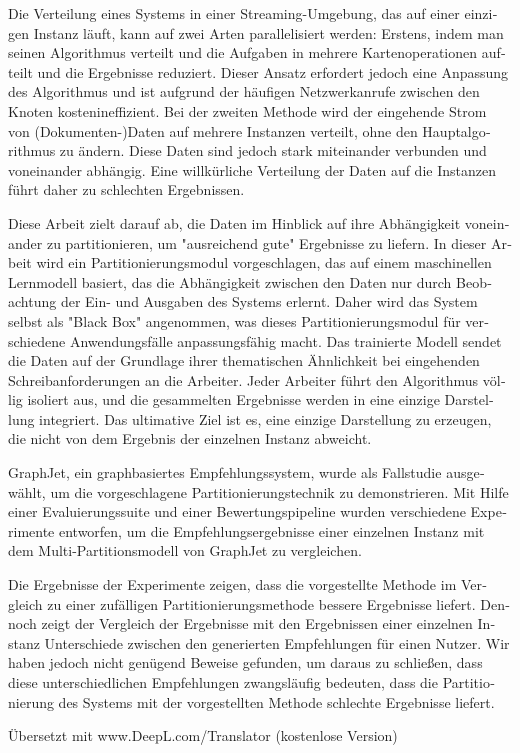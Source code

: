 \null\vfil
\begin{otherlanguage}{ngerman}
\begin{center}\textsf{\textbf{\abstractname}}\end{center}

\noindent 
Die Verteilung eines Systems in einer Streaming-Umgebung, das auf einer einzigen Instanz läuft, kann auf zwei Arten parallelisiert werden: Erstens, indem man seinen Algorithmus verteilt und die Aufgaben in mehrere Kartenoperationen aufteilt und die Ergebnisse reduziert. Dieser Ansatz erfordert jedoch eine Anpassung des Algorithmus und ist aufgrund der häufigen Netzwerkanrufe zwischen den Knoten kostenineffizient. Bei der zweiten Methode wird der eingehende Strom von (Dokumenten-)Daten auf mehrere Instanzen verteilt, ohne den Hauptalgorithmus zu ändern. Diese Daten sind jedoch stark miteinander verbunden und voneinander abhängig. Eine willkürliche Verteilung der Daten auf die Instanzen führt daher zu schlechten Ergebnissen.

Diese Arbeit zielt darauf ab, die Daten im Hinblick auf ihre Abhängigkeit voneinander zu partitionieren, um "ausreichend gute" Ergebnisse zu liefern. In dieser Arbeit wird ein Partitionierungsmodul vorgeschlagen, das auf einem maschinellen Lernmodell basiert, das die Abhängigkeit zwischen den Daten nur durch Beobachtung der Ein- und Ausgaben des Systems erlernt. Daher wird das System selbst als "Black Box" angenommen, was dieses Partitionierungsmodul für verschiedene Anwendungsfälle anpassungsfähig macht. Das trainierte Modell sendet die Daten auf der Grundlage ihrer thematischen Ähnlichkeit bei eingehenden Schreibanforderungen an die Arbeiter. Jeder Arbeiter führt den Algorithmus völlig isoliert aus, und die gesammelten Ergebnisse werden in eine einzige Darstellung integriert. Das ultimative Ziel ist es, eine einzige Darstellung zu erzeugen, die nicht von dem Ergebnis der einzelnen Instanz abweicht.

GraphJet, ein graphbasiertes Empfehlungssystem, wurde als Fallstudie ausgewählt, um die vorgeschlagene Partitionierungstechnik zu demonstrieren. Mit Hilfe einer Evaluierungssuite und einer Bewertungspipeline wurden verschiedene Experimente entworfen, um die Empfehlungsergebnisse einer einzelnen Instanz mit dem Multi-Partitionsmodell von GraphJet zu vergleichen.


Die Ergebnisse der Experimente zeigen, dass die vorgestellte Methode im Vergleich zu einer zufälligen Partitionierungsmethode bessere Ergebnisse liefert. Dennoch zeigt der Vergleich der Ergebnisse mit den Ergebnissen einer einzelnen Instanz Unterschiede zwischen den generierten Empfehlungen für einen Nutzer. Wir haben jedoch nicht genügend Beweise gefunden, um daraus zu schließen, dass diese unterschiedlichen Empfehlungen zwangsläufig bedeuten, dass die Partitionierung des Systems mit der vorgestellten Methode schlechte Ergebnisse liefert.

Übersetzt mit www.DeepL.com/Translator (kostenlose Version)

\end{otherlanguage}
\vfil\null



